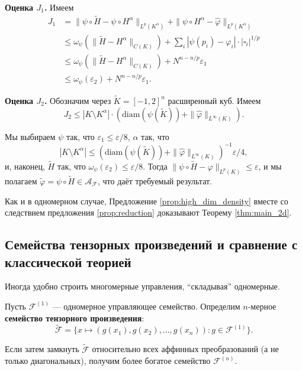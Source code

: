 \documentclass[../NDCNNAI_main.tex]{subfiles}
\begin{document}
\textbf{Оценка \(J_1\).} Имеем
\begin{align*}
J_1 &= \|\psi \circ \tilde{H} - \psi \circ H^{\alpha}\|_{L^{p}(K^{\alpha})} + \|\psi \circ H^{\alpha} - \hat{\varphi}\|_{L^{p}(K^{\alpha})} \\
&\leq \omega_{\psi}(\|\tilde{H} - H^{\alpha}\|_{C(K)}) + \sum_{i} |\psi(p_i) - \varphi_i| \cdot |\square_i|^{1/p} \\
&\leq \omega_{\psi}(\|\tilde{H} - H^{\alpha}\|_{C(K)}) + N^{n-n/p} \varepsilon_1 \\
&\leq \omega_{\psi}(\varepsilon_2) + N^{n-n/p} \varepsilon_1.
\end{align*}

\textbf{Оценка \(J_2\).} Обозначим через \(\tilde{K} = [-1, 2]^n\) расширенный куб. Имеем
\[
J_2 \leq |K \setminus K^{\alpha}| \cdot (\text{diam}(\psi(\tilde{K})) + \|\hat{\varphi}\|_{L^{\infty}(K)}). 
\]

Мы выбираем \(\psi\) так, что \(\varepsilon_1 \leq \varepsilon/8\), \(\alpha\) так, что
\[
|K \setminus K^{\alpha}| \leq (\text{diam}(\psi(\tilde{K})) + \|\hat{\varphi}\|_{L^{\infty}(K)})^{-1} \varepsilon/4, 
\]
и, наконец, \(\tilde{H}\) так, что \(\omega_{\psi}(\varepsilon_2) \leq \varepsilon/8\). Тогда \(\|\psi \circ \tilde{H} - \varphi\|_{L^{p}(K)} \leq \varepsilon\), и мы полагаем \(\tilde{\varphi} = \psi \circ \tilde{H} \in \mathcal{A}_{\mathcal{F}}\), что даёт требуемый результат.

Как и в одномерном случае, Предложение \ref{prop:high_dim_density} вместе со следствием предложения \ref{prop:reduction} доказывают Теорему \ref{thm:main_2d}.

\subsection{Семейства тензорных произведений и сравнение с классической теорией}

Иногда удобно строить многомерные управления, ``складывая'' одномерные.

\begin{definition}
Пусть $\mathcal{F}^{(1)}$ --- одномерное управляющее семейство. Определим $n$-мерное \textbf{семейство тензорного произведения}:
\[
\widetilde{\mathcal{F}} = \{ x \mapsto (g(x_1), g(x_2), \ldots, g(x_n)) : g \in \mathcal{F}^{(1)} \}.
\]
\end{definition}
Если затем замкнуть $\widetilde{\mathcal{F}}$ относительно всех аффинных преобразований (а не только диагональных), получим более богатое семейство $\mathcal{F}^{(n)}$.
\end{document}
